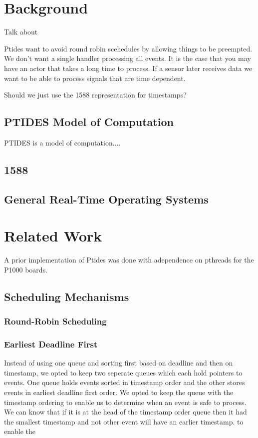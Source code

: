 \documentclass{sig-alternate}
\begin{document}
\section{Background}
Talk about 

Ptides want to avoid round robin scehedules by allowing things to be preempted. We don't want a single handler processing all events. It is the case that you may have an actor that takes a long time to process. If a sensor later receives data we want to be able to process signals that are time dependent.

Should we just use the 1588 representation for timestamps?

\subsection{PTIDES Model of Computation}
PTIDES is a \cite{ptidesTechReport} model of computation....

\subsection{1588}
\subsection{General Real-Time Operating Systems}



\section{Related Work}
A prior implementation of Ptides was done with adependence on pthreads for the P1000 boards.

\subsection{Scheduling Mechanisms}
\subsubsection{Round-Robin Scheduling}
\subsubsection{Earliest Deadline First}
Instead of using one queue and sorting first based on deadline and then on timestamp, we opted to keep two seperate queues which each hold pointers to events. One queue holds events sorted in timestamp order and the other stores events in earliest deadline first order. We opted to keep the queue with the timestamp ordering to enable us to determine when an event is safe to process. We can know that if it is at the head of the timestamp order queue then it had the smallest timestamp and not other event will have an earlier timestamp.
to enable the 
\end{document}
